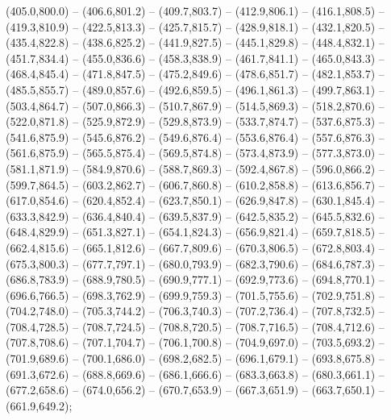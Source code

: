 (405.0,800.0) -- (406.6,801.2) -- (409.7,803.7) -- (412.9,806.1) -- (416.1,808.5) -- (419.3,810.9) -- (422.5,813.3) -- (425.7,815.7) -- (428.9,818.1) -- (432.1,820.5) -- (435.4,822.8) -- (438.6,825.2) -- (441.9,827.5) -- (445.1,829.8) -- (448.4,832.1) -- (451.7,834.4) -- (455.0,836.6) -- (458.3,838.9) -- (461.7,841.1) -- (465.0,843.3) -- (468.4,845.4) -- (471.8,847.5) -- (475.2,849.6) -- (478.6,851.7) -- (482.1,853.7) -- (485.5,855.7) -- (489.0,857.6) -- (492.6,859.5) -- (496.1,861.3) -- (499.7,863.1) -- (503.4,864.7) -- (507.0,866.3) -- (510.7,867.9) -- (514.5,869.3) -- (518.2,870.6) -- (522.0,871.8) -- (525.9,872.9) -- (529.8,873.9) -- (533.7,874.7) -- (537.6,875.3) -- (541.6,875.9) -- (545.6,876.2) -- (549.6,876.4) -- (553.6,876.4) -- (557.6,876.3) -- (561.6,875.9) -- (565.5,875.4) -- (569.5,874.8) -- (573.4,873.9) -- (577.3,873.0) -- (581.1,871.9) -- (584.9,870.6) -- (588.7,869.3) -- (592.4,867.8) -- (596.0,866.2) -- (599.7,864.5) -- (603.2,862.7) -- (606.7,860.8) -- (610.2,858.8) -- (613.6,856.7) -- (617.0,854.6) -- (620.4,852.4) -- (623.7,850.1) -- (626.9,847.8) -- (630.1,845.4) -- (633.3,842.9) -- (636.4,840.4) -- (639.5,837.9) -- (642.5,835.2) -- (645.5,832.6) -- (648.4,829.9) -- (651.3,827.1) -- (654.1,824.3) -- (656.9,821.4) -- (659.7,818.5) -- (662.4,815.6) -- (665.1,812.6) -- (667.7,809.6) -- (670.3,806.5) -- (672.8,803.4) -- (675.3,800.3) -- (677.7,797.1) -- (680.0,793.9) -- (682.3,790.6) -- (684.6,787.3) -- (686.8,783.9) -- (688.9,780.5) -- (690.9,777.1) -- (692.9,773.6) -- (694.8,770.1) -- (696.6,766.5) -- (698.3,762.9) -- (699.9,759.3) -- (701.5,755.6) -- (702.9,751.8) -- (704.2,748.0) -- (705.3,744.2) -- (706.3,740.3) -- (707.2,736.4) -- (707.8,732.5) -- (708.4,728.5) -- (708.7,724.5) -- (708.8,720.5) -- (708.7,716.5) -- (708.4,712.6) -- (707.8,708.6) -- (707.1,704.7) -- (706.1,700.8) -- (704.9,697.0) -- (703.5,693.2) -- (701.9,689.6) -- (700.1,686.0) -- (698.2,682.5) -- (696.1,679.1) -- (693.8,675.8) -- (691.3,672.6) -- (688.8,669.6) -- (686.1,666.6) -- (683.3,663.8) -- (680.3,661.1) -- (677.2,658.6) -- (674.0,656.2) -- (670.7,653.9) -- (667.3,651.9) -- (663.7,650.1) -- (661.9,649.2);
